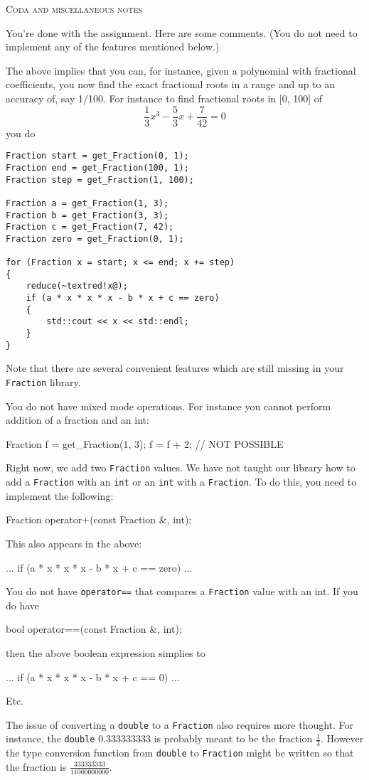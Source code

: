 \newpage
\textsc{Coda and miscellaneous notes}

You're done with the assignment.
Here are some comments.
(You do not need to implement any of the features mentioned below.)

The above implies that you can, for instance,
given a polynomial with fractional coefficients,
you
now find the exact fractional roots in a range and
up to an accuracy of, say 1/100.
For instance to find fractional roots in [0, 100]
of  
\[
\frac{1}{3} x^3 - \frac{5}{3} x + \frac{7}{42} = 0
\]
you do
\begin{Verbatim}[frame=single,fontsize=\small,commandchars=\~\!\@]
Fraction start = get_Fraction(0, 1);
Fraction end = get_Fraction(100, 1);
Fraction step = get_Fraction(1, 100);

Fraction a = get_Fraction(1, 3);
Fraction b = get_Fraction(3, 3);
Fraction c = get_Fraction(7, 42);
Fraction zero = get_Fraction(0, 1);

for (Fraction x = start; x <= end; x += step)
{
    reduce(~textred!x@);
    if (a * x * x * x - b * x + c == zero)
    {
        std::cout << x << std::endl;
    }
}
\end{Verbatim}

Note that there are several convenient features which are
still missing in your \verb!Fraction! library.

You do not have mixed mode operations.
For instance you cannot perform addition of a fraction and an int:
\begin{console}
Fraction f = get_Fraction(1, 3);
f = f + 2; // NOT POSSIBLE
\end{console}
Right now, we add two \verb!Fraction! values.
We have not taught our library
how to add a \verb!Fraction! with an \verb!int! or an \verb!int! with a
\verb!Fraction!.
To do this, 
you need to implement the following:
\begin{console}
Fraction operator+(const Fraction &, int);
\end{console}
This also appears in the above:
\begin{console}
...
    if (a * x * x * x - b * x + c == zero)
...
\end{console}
You do not have \verb!operator==! that compares a \verb!Fraction! value with an
int.
If you do have
\begin{console}
bool operator==(const Fraction &, int);
\end{console}
then the above boolean expression simplies to
\begin{console}
...
    if (a * x * x * x - b * x + c == 0)
...
\end{console}

Etc.

The issue of converting a \verb!double! to a \verb!Fraction! also requires more
thought. For instance, the \verb!double! $0.333333333$ is probably meant to
be the fraction $\frac{1}{3}$. However the type conversion function from
\verb!double! to \verb!Fraction! might be written so that the fraction is
$\frac{333333333}{11000000000}$.


